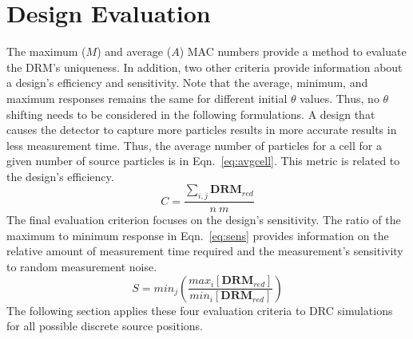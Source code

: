 \documentclass[3p,times]{elsarticle}
\begin{document}
\section{Design Evaluation}
The maximum ($M$) and average ($A$) MAC numbers provide a method to evaluate the DRM's uniqueness.  In addition, two other criteria provide information about a design's efficiency and sensitivity.
Note that the average, minimum, and maximum responses remains the same for different initial $\theta$ values.  Thus, no $\theta$ shifting needs to be considered in the following formulations.  
A design that causes the detector to capture more particles results in more accurate results in less measurement time.  Thus, the average number of particles for a cell for a given number
of source particles is in Eqn.~\ref{eq:avgcell}.  This metric is related to the design's efficiency.
\begin{equation}
C=\frac{\sum_{i,j}\mathbf{DRM}_{red}}{n\ m}
\label{eq:avgcell}
\end{equation}
The final evaluation criterion focuses on the design's sensitivity.  The ratio of the maximum to minimum response in Eqn.~\ref{eq:sens} provides information on the relative amount of measurement time required and the measurement's sensitivity to random measurement noise. 
\begin{equation}
S=min_{j}\left(\frac{max_{i} \left[\mathbf{DRM}_{red}\right]}{min_{i} \left[\mathbf{DRM}_{red}\right]}\right)
\label{eq:sens}
\end{equation}
The following section applies these four evaluation criteria to DRC simulations for all possible discrete source positions.
\end{document}
